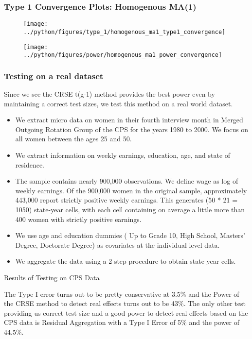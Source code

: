 \documentclass[11pt, aspectratio=169]{beamer}
\begin{document}
\begin{frame}[t]
    \frametitle{Type 1 Convergence Plots: Homogenous MA(1)}

    \begin{figure}[H]
        \centering
        \texttt{[image: ../python/figures/type\_1/homogenous\_ma1\_type1\_convergence]}

    \end{figure}

    \begin{figure}[H]
        \centering
        \texttt{[image: ../python/figures/power/homogenous\_ma1\_power\_convergence]}
    \end{figure}


\end{frame}


\begin{frame}[t]
    \frametitle{Testing on a real dataset}

    Since we see the CRSE t(g-1) method provides the best power even by maintaining a correct test sizes, we test this method on a real world dataset. 

    \begin{itemize}
        \item We extract micro data on women in their fourth interview month in Merged Outgoing Rotation Group of the CPS for the years 1980 to 2000. We focus on all women between the ages 25 and 50. 
        \item We extract information on weekly earnings, education, age, and state of residence.
        \item The sample contains nearly 900,000 observations. We define wage as log of weekly earnings. Of the 900,000 women in the original sample, approximately 443,000 report strictly positive weekly earnings. This generates (50 * 21 = 1050) state-year cells, with each cell containing on average a little more than 400 women with strictly positive earnings.    
        \item We use age and education dummies ( Up to Grade 10, High School, Masters’ Degree, Doctorate Degree) as covariates at the individual level data.
        \item We aggregate the data using a 2 step procedure to obtain state year cells.
    \end{itemize}
    
\end{frame}

\begin{frame}{Results of Testing on CPS Data}

    The Type I error turns out to be pretty conservative at 3.5\% and the Power of the CRSE method 
    to detect real effects turns out to be 43\%. 
    The only other test providing us correct test size and a good power to detect real effects based on the 
    CPS data is Residual Aggregation with a Type I Error of 5\% and the power of 44.5\%.
    
\end{frame}
\end{document}
